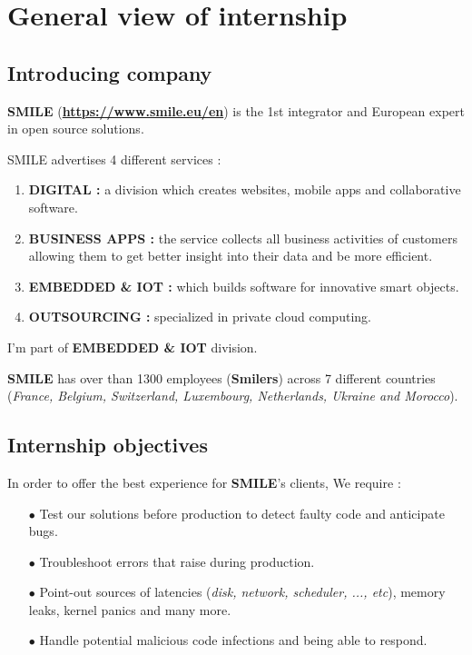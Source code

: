 \section{General view of internship}

\subsection{Introducing company}
\textbf{SMILE} (\textbf{\color{blue}\url{https://www.smile.eu/en}}) is the 1st integrator and European expert in open source solutions. 

SMILE advertises 4 different services :
\begin{enumerate}
	\item \textbf{DIGITAL : } a division which creates websites, mobile apps and collaborative software. 
	\item \textbf{BUSINESS APPS : } the service collects all business activities of customers allowing them to get better insight into their data and be more efficient. 
	\item \textbf{EMBEDDED \& IOT : } which builds software for innovative smart objects.
	\item \textbf{OUTSOURCING : } specialized in private cloud computing. 
\end{enumerate}


\begin{center} \color{red}
I'm part of \textbf{EMBEDDED \& IOT} division.
\end{center}

\textbf{SMILE} has over than 1300 employees (\textbf{Smilers}) across 7 different countries (\textit{France, Belgium, Switzerland, Luxembourg, Netherlands, Ukraine and Morocco}).

\subsection{Internship objectives}
In order to offer the best experience for \textbf{SMILE}'s clients, We require :

\begin{itemize}
\item[$\bullet$] Test our solutions before production to detect faulty code and anticipate bugs.
\item[$\bullet$] Troubleshoot errors that raise during production. 
\item[$\bullet$] Point-out sources of latencies (\emph{disk, network, scheduler, ..., etc}), memory leaks, kernel panics and many more.
\item[$\bullet$] Handle potential malicious code infections and being able to respond.
\end{itemize}

